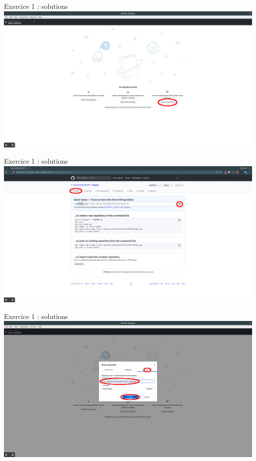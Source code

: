 \documentclass{beamer}
\begin{document}
\begin{frame}{Exercice 1 : solutions}
	\centering
    \includegraphics[scale=0.16]{img/image_exercices/clonning_repo.png}
\end{frame}

\begin{frame}{Exercice 1 : solutions}
	\centering
    \includegraphics[scale=0.16]{img/image_exercices/getting_url.png}
\end{frame}

\begin{frame}{Exercice 1 : solutions}
	\centering
    \includegraphics[scale=0.16]{img/image_exercices/cloning_with_url.png}
\end{frame}
\end{document}
